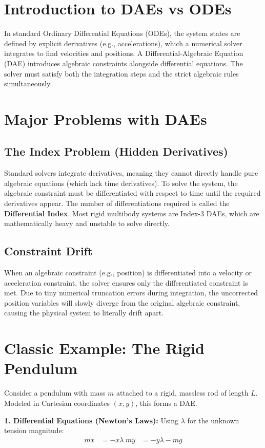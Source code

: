 \section{Introduction to DAEs vs ODEs}
In standard Ordinary Differential Equations (ODEs), the system states are defined by explicit derivatives (e.g., accelerations), which a numerical solver integrates to find velocities and positions. A Differential-Algebraic Equation (DAE) introduces algebraic constraints alongside differential equations. The solver must satisfy both the integration steps and the strict algebraic rules simultaneously.

\section{Major Problems with DAEs}
\subsection{The Index Problem (Hidden Derivatives)}
Standard solvers integrate derivatives, meaning they cannot directly handle pure algebraic equations (which lack time derivatives). To solve the system, the algebraic constraint must be differentiated with respect to time until the required derivatives appear. The number of differentiations required is called the \textbf{Differential Index}. Most rigid multibody systems are Index-3 DAEs, which are mathematically heavy and unstable to solve directly.

\subsection{Constraint Drift}
When an algebraic constraint (e.g., position) is differentiated into a velocity or acceleration constraint, the solver ensures only the differentiated constraint is met. Due to tiny numerical truncation errors during integration, the uncorrected position variables will slowly diverge from the original algebraic constraint, causing the physical system to literally drift apart.

\section{Classic Example: The Rigid Pendulum}
Consider a pendulum with mass $m$ attached to a rigid, massless rod of length $L$. Modeled in Cartesian coordinates $(x, y)$, this forms a DAE.

\textbf{1. Differential Equations (Newton's Laws):}
Using $\lambda$ for the unknown tension magnitude:
\begin{align}
m\ddot{x} &= -x\lambda \
m\ddot{y} &= -y\lambda - mg
\end{align}

